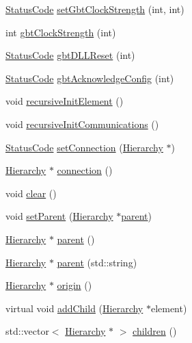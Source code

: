 \begin{DoxyCompactItemize}
\item 
\hyperlink{classStatusCode}{Status\+Code} \hyperlink{classFEB__v1_a717d56186e6221cb20397cc3e496da50}{set\+Gbt\+Clock\+Strength} (int, int)
\item 
int \hyperlink{classFEB__v1_a6ca15de02d32e38a0fc90ad29302072e}{gbt\+Clock\+Strength} (int)
\item 
\hyperlink{classStatusCode}{Status\+Code} \hyperlink{classFEB__v1_a79b299ce9b36b51916103371aef027df}{gbt\+D\+L\+L\+Reset} (int)
\item 
\hyperlink{classStatusCode}{Status\+Code} \hyperlink{classFEB__v1_af7e7f3cb7269dc811866bc42585cf020}{gbt\+Acknowledge\+Config} (int)
\item 
void \hyperlink{classElement_a3c0abcb36f8906688bb7e32608df7086}{recursive\+Init\+Element} ()
\item 
void \hyperlink{classElement_a82119ed37dff76508a2746a853ec35ba}{recursive\+Init\+Communications} ()
\item 
\hyperlink{classStatusCode}{Status\+Code} \hyperlink{classElement_ab476b4b1df5954141ceb14f072433b89}{set\+Connection} (\hyperlink{classHierarchy}{Hierarchy} $\ast$)
\item 
\hyperlink{classHierarchy}{Hierarchy} $\ast$ \hyperlink{classElement_af57444353c1ddf9fa0109801e97debf7}{connection} ()
\item 
void \hyperlink{classHierarchy_af4d43b0765b402670eed2d62c73405af}{clear} ()
\item 
void \hyperlink{classHierarchy_a585ad1aeec16077a0e532ab8b4fc557b}{set\+Parent} (\hyperlink{classHierarchy}{Hierarchy} $\ast$\hyperlink{classHierarchy_a1c7bec8257e717f9c1465e06ebf845fc}{parent})
\item 
\hyperlink{classHierarchy}{Hierarchy} $\ast$ \hyperlink{classHierarchy_a1c7bec8257e717f9c1465e06ebf845fc}{parent} ()
\item 
\hyperlink{classHierarchy}{Hierarchy} $\ast$ \hyperlink{classHierarchy_ad550588733bf75ac5c0fcfd7c8fd11a6}{parent} (std\+::string)
\item 
\hyperlink{classHierarchy}{Hierarchy} $\ast$ \hyperlink{classHierarchy_aee461dc930ce3871636ff87f075b1b83}{origin} ()
\item 
virtual void \hyperlink{classHierarchy_ad677774ff38fcb257c04a3a10d471fac}{add\+Child} (\hyperlink{classHierarchy}{Hierarchy} $\ast$element)
\item 
std\+::vector$<$ \hyperlink{classHierarchy}{Hierarchy} $\ast$ $>$ \hyperlink{classHierarchy_aa9a76f69e98e052ee1a6e32cea006288}{children} ()
\item 

\end{DoxyCompactItemize}
